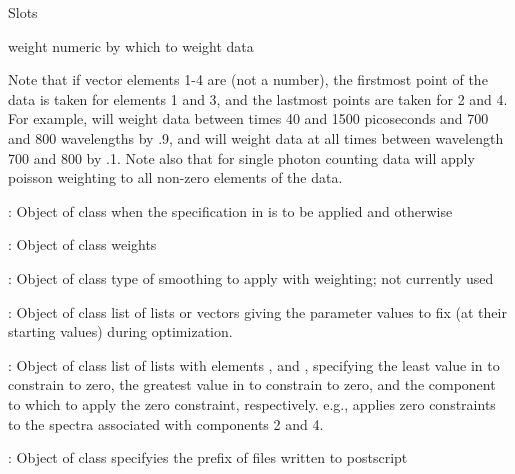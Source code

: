 \documentclass{article}
\begin{document}
\begin{Section}{Slots}
{{\item[weight] numeric by which to weight data 
}
Note that if vector elements 1-4 are  (not a number), the firstmost 
point of the data is taken for elements 1 and 3, and the lastmost points
are taken for 2 and 4. 
For example,   will weight data between times 40 and 1500 
picoseconds and 700 and 800 wavelengths by .9, and will weight data at 
all times between wavelength 700 and 800 by .1.  
Note also that for single photon counting data 
 will apply poisson weighting to all 
non-zero elements of the data. 
\item[\code{weight}:] Object of class   when the specification in 
 is to be applied and  otherwise
\item[\code{weightM}:] Object of class  weights 
\item[\code{weightsmooth}:] Object of class  type of smoothing to apply with weighting; not currently
used
\item[\code{fixed}:] Object of class  list of lists or vectors giving the parameter values 
to fix (at their starting values) during optimization. 
\item[\code{clp0}:] Object of class   list of lists with elements ,  and 
, specifying the least value in   to constrain 
to zero, the greatest value in   to 
constrain to zero, and the component to which to apply the zero constraint, 
respectively.  e.g.,  applies zero constraints to the spectra 
associated with components 2 and 4. 
\item[\code{makeps}:] Object of class  
specifyies the prefix of files written to 
postscript

}
\end{Section}
\end{document}
